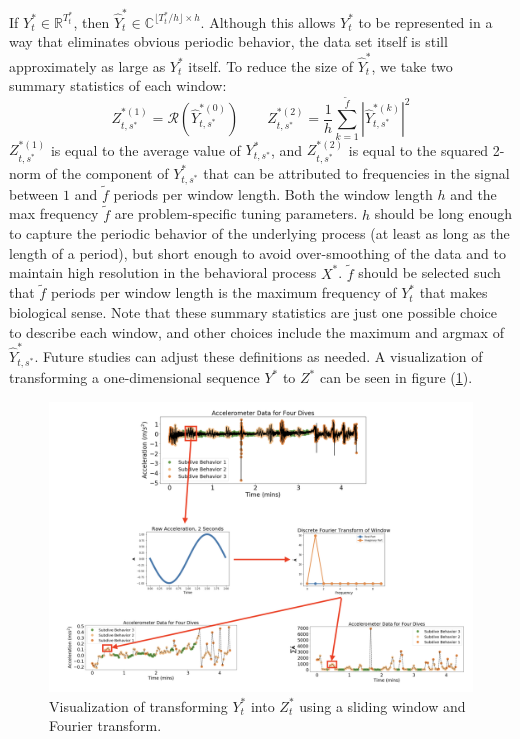 If $Y^*_t \in \mathbb{R}^{T^*_t}$, then $\hat{Y}_t^* \in \mathbb{C}^{\lfloor T^*_t / h \rfloor \times h}$. Although this allows $Y^*_t$ to be represented in a way that eliminates obvious periodic behavior, the data set itself is still approximately as large as $Y^*_t$ itself. To reduce the size of $\hat{Y}^*_t$, we take two summary statistics of each window:
%
$$Z_{t,s^*}^{*(1)} = \mathcal{R}\left(\hat{Y}^{*(0)}_{t,s^*}\right) \qquad Z_{t,s^*}^{*(2)} = \frac{1}{h}\sum_{k=1}^{\tilde{f}}|\hat{Y}^{*(k)}_{t,s^*}|^2$$
%
$Z_{t,s^*}^{*(1)}$ is equal to the average value of $Y_{t,s^*}^*$, and $Z_{t,s^*}^{*(2)}$ is equal to the squared 2-norm of the component of $Y_{t,s^*}^*$ that can be attributed to frequencies in the signal between $1$ and $\tilde{f}$ periods per window length. Both the window length $h$ and the max frequency $\tilde{f}$ are problem-specific tuning parameters. $h$ should be long enough to capture the periodic behavior of the underlying process (at least as long as the length of a period), but short enough to avoid over-smoothing of the data and to maintain high resolution in the behavioral process $X^*$. $\tilde{f}$ should be selected such that $\tilde{f}$ periods per window length is the maximum frequency of $Y_t^*$ that makes biological sense. Note that these summary statistics are just one possible choice to describe each window, and other choices include the maximum and argmax of $\hat Y^*_{t,s^*}$. Future studies can adjust these definitions as needed. A visualization of transforming a one-dimensional sequence $Y^*$ to $Z^*$ can be seen in figure (\ref{fig:fourier_example}).

\begin{figure}[h!]
	\centering
	\includegraphics[width=5.5in]{../Plots/fourier_transform.png}
	\caption{Visualization of transforming $Y^*_t$ into $Z^*_t$ using a sliding window and Fourier transform.}
	\label{fig:fourier_example}
\end{figure}

